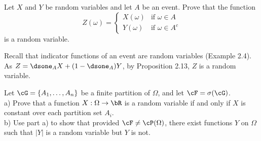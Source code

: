 \begin{exercise}
  Let $X$ and $Y$ be random variables and let $A$ be an event. Prove that the function
  \[
    Z(\omega) = \begin{cases}
      X(\omega) & \mbox{if } \omega\in A \\
      Y(\omega) & \mbox{if } \omega\in A^c
    \end{cases}
  \]
  is a random variable.
\end{exercise}
\begin{solution}
  Recall that indicator functions of an event are random variables (Example 2.4). As $Z = \dsone_A X + (1-\dsone_A) Y$, by Proposition 2.13, $Z$ is a random variable.
\end{solution}


\begin{exercise}
  Let $\cG=\{A_1,\ldots,A_n\}$ be a finite partition of $\Omega$, and let $\cF=\sigma(\cG)$. \\
  a) Prove that a function $X:\Omega\to\bR$ is a random variable if and only if $X$ is constant over each partition set $A_i$. \\
  b) Use part a) to show that provided $\cF\neq \cP(\Omega)$, there exist functions $Y$ on $\Omega$ such that $|Y|$ is a random variable but $Y$ is not.
\end{exercise}
\begin{solution}
  [TODO]
\end{solution}

